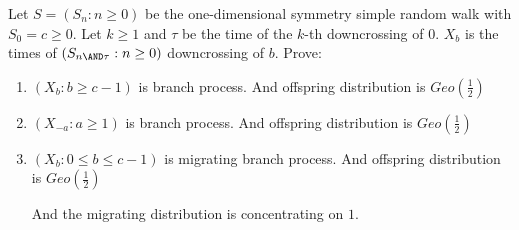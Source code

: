 \documentclass{ctexart}
\newif\ifpreface
\begin{document}
\large
\setlength{\baselineskip}{1.2em}
\ifpreface
  
\else
\fi
{}
\begin{problem}\label{pro:1}
  Let \(S=(S_n:n \geq 0)\) be the one-dimensional symmetry simple random walk with \(S_0=c \geq 0\).
  Let \(k \geq 1\) and \(\tau\) be the time of the \(k\)-th downcrossing of \(0\).
  \(X_b\) is the times of \((S_{n \AND \tau}:n \geq 0)\) downcrossing of \(b\). Prove:
  \begin{enumerate}
    \item \((X_b:b \geq c-1)\) is branch process.
      And offspring distribution is \(Geo(\frac{1}{2})\)

    \item \((X_{-a}:a \geq 1)\) is branch process.
      And offspring distribution is \(Geo(\frac{1}{2})\)

    \item \((X_b:0 \leq b \leq c-1)\) is migrating branch process.
      And offspring distribution is \(Geo(\frac{1}{2})\)

      And the migrating distribution is concentrating on \(1\).

  \end{enumerate}
\end{problem}
\end{document}
